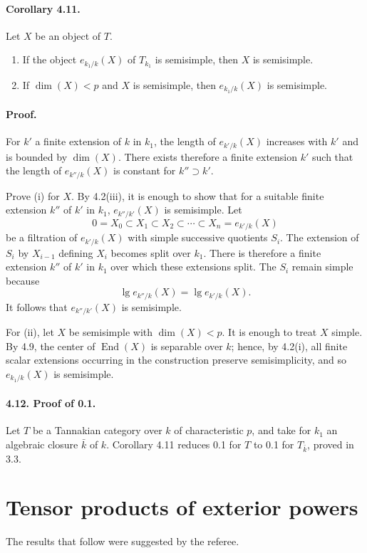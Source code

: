 \documentclass[11pt]{article}
\newcommand{\End}{\operatorname{End}}
\theoremstyle{plain}
\theoremstyle{definition}
\begin{document}
\paragraph{Corollary 4.11.} Let $X$ be an object of $T$.
\begin{enumerate}[label=(\roman*)]
\item If the object $e_{k_1/k}(X)$ of $T_{k_1}$ is semisimple, then $X$ is semisimple.
\item If $\dim(X)<p$ and $X$ is semisimple, then $e_{k_1/k}(X)$ is semisimple.
\end{enumerate}

\paragraph{Proof.} For $k'$ a finite extension of $k$ in $k_1$, the length of $e_{k'/k}(X)$ increases with $k'$ and is bounded by $\dim(X)$. There exists therefore a finite extension $k'$ such that the length of $e_{k''/k}(X)$ is constant for $k''\supset k'$.

Prove (i) for $X$. By 4.2(iii), it is enough to show that for a suitable finite extension $k''$ of $k'$ in $k_1$, $e_{k''/k'}(X)$ is semisimple. Let
\[
   0=X_0\subset X_1\subset X_2\subset\cdots\subset X_n=e_{k'/k}(X)
\]
be a filtration of $e_{k'/k}(X)$ with simple successive quotients $S_i$. The extension of $S_i$ by $X_{i-1}$ defining $X_i$ becomes split over $k_1$. There is therefore a finite extension $k''$ of $k'$ in $k_1$ over which these extensions split. The $S_i$ remain simple because
\[
   \lg e_{k''/k}(X)=\lg e_{k'/k}(X).
\]
It follows that $e_{k''/k'}(X)$ is semisimple.

For (ii), let $X$ be semisimple with $\dim(X)<p$. It is enough to treat $X$ simple. By 4.9, the center of $\End(X)$ is separable over $k$; hence, by 4.2(i), all finite scalar extensions occurring in the construction preserve semisimplicity, and so $e_{k_1/k}(X)$ is semisimple.

\paragraph{4.12. Proof of 0.1.} Let $T$ be a Tannakian category over $k$ of characteristic $p$, and take for $k_1$ an algebraic closure $\bar k$ of $k$. Corollary 4.11 reduces 0.1 for $T$ to 0.1 for $T_{\bar k}$, proved in 3.3.

\section{Tensor products of exterior powers}
The results that follow were suggested by the referee.
\end{document}
